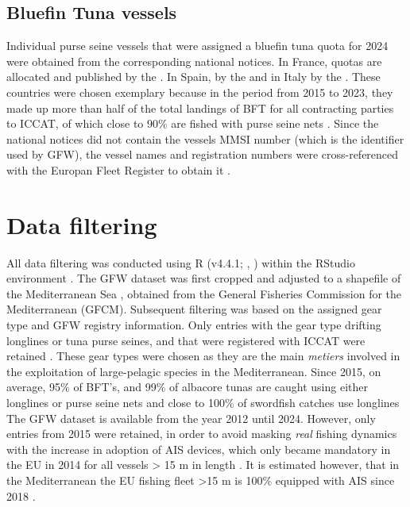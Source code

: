 \subsection{Bluefin Tuna vessels}
Individual purse seine vessels that were assigned a bluefin tuna quota for 2024 were obtained from the corresponding national notices. In France,
quotas are allocated and published by the \cite{registry_france}. In Spain,
by the \cite{registry_spain} and in Italy by the \cite{registry_italy}. These countries were chosen exemplary because in the period from 2015 to 2023,
they made up more than half of the total landings of BFT for all contracting parties to ICCAT, of which close to 90\% are fished with purse seine nets \citep{iccat_bft_summary}.
Since the national notices did not contain the vessels MMSI number (which is the identifier used by GFW), the vessel names and registration numbers were
cross-referenced with the Europan Fleet Register to obtain it \citep{eu_fleet_register}. 


\section{Data filtering}
All data filtering was conducted using R (v4.4.1; \citeauthor{r_language}, \citeyear{r_language}) within the RStudio environment \citep{rstudio}.
The GFW dataset was first cropped and adjusted to a shapefile of the Mediterranean Sea , obtained from the General Fisheries
Commission for the Mediterranean (GFCM). Subsequent filtering was based on the assigned gear type and GFW registry
information. Only entries with the gear type drifting longlines or tuna purse seines, and that were registered with
ICCAT were retained . These gear types were chosen as they are the main \textit{metiers} involved in the exploitation of large-pelagic species in the Mediterranean.
Since 2015, on average, 95\% of BFT's, and 99\% of albacore tunas are caught using either longlines or purse seine nets and close to 100\% of swordfish catches use longlines \citep{iccat_bft_summary,iccat_alb_summary,iccat_swo_summary}
The GFW dataset is available from the year 2012 until 2024. However, only entries from 2015 were retained, in order to avoid masking \textit{real} fishing dynamics with the increase in
adoption of AIS devices, which only became mandatory in the EU in 2014 for all vessels > 15 m in length \citep{ec2011directive}. It is estimated however, that in the Mediterranean the EU fishing fleet >15 m is 100\% equipped with AIS since 2018 \citep{taconet2019global}.

